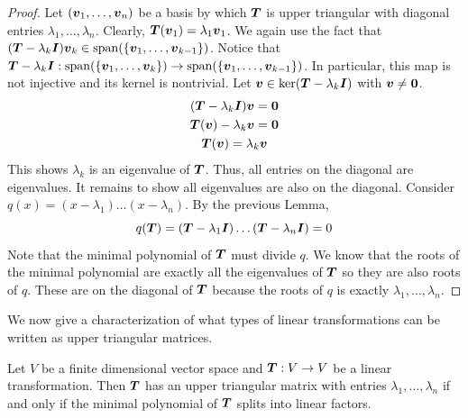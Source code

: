 \begin{proof}
    Let $(\boldsymbol{v}_1,\dots,\boldsymbol{v}_n)$ be a basis by which $\boldsymbol{T}$ is upper triangular with diagonal entries $\lambda_1,\dots,\lambda_n$. Clearly, $\boldsymbol{T}(\boldsymbol{v}_1)=\lambda_1\boldsymbol{v}_1$. We again use the fact that $(\boldsymbol{T}-\lambda_k\boldsymbol{I})\boldsymbol{v}_k\in\operatorname{span}(\{\boldsymbol{v}_1,\dots,\boldsymbol{v}_{k-1}\})$. Notice that $\boldsymbol{T}-\lambda_k\boldsymbol{I}:\operatorname{span}(\{\boldsymbol{v}_1,\dots,\boldsymbol{v}_k\})\to\operatorname{span}(\{\boldsymbol{v}_1,\dots,\boldsymbol{v}_{k-1}\})$. In particular, this map is not injective and its kernel is nontrivial. Let $\boldsymbol{v}\in\ker(\boldsymbol{T}-\lambda_k\boldsymbol{I})$ with $\boldsymbol{v}\neq\boldsymbol{0}$.
    \begin{gather*}
        (\boldsymbol{T}-\lambda_k\boldsymbol{I})\boldsymbol{v}=\boldsymbol{0}\\
        \boldsymbol{T}(\boldsymbol{v})-\lambda_k\boldsymbol{v}=\boldsymbol{0}\\
        \boldsymbol{T}(\boldsymbol{v})=\lambda_k\boldsymbol{v}
    \end{gather*}
    This shows $\lambda_k$ is an eigenvalue of $\boldsymbol{T}$. Thus, all entries on the diagonal are eigenvalues. It remains to show all eigenvalues are also on the diagonal. Consider $q(x)=(x-\lambda_1)\dots(x-\lambda_n)$. By the previous Lemma,
    $$q(\boldsymbol{T})=(\boldsymbol{T}-\lambda_1\boldsymbol{I})\dots(\boldsymbol{T}-\lambda_n\boldsymbol{I})=0$$
    Note that the minimal polynomial of $\boldsymbol{T}$ must divide $q$. We know that the roots of the minimal polynomial are exactly all the eigenvalues of $\boldsymbol{T}$ so they are also roots of $q$. These are on the diagonal of $\boldsymbol{T}$ because the roots of $q$ is exactly $\lambda_1,\dots,\lambda_n$.
\end{proof}
We now give a characterization of what types of linear transformations can be written as upper triangular matrices.
\begin{theorem}
    Let $V$ be a finite dimensional vector space and $\boldsymbol{T}:V\to V$ be a linear transformation. Then $\boldsymbol{T}$ has an upper triangular matrix with entries $\lambda_1,\dots,\lambda_n$ if and only if the minimal polynomial of $\boldsymbol{T}$ splits into linear factors.
\end{theorem}

